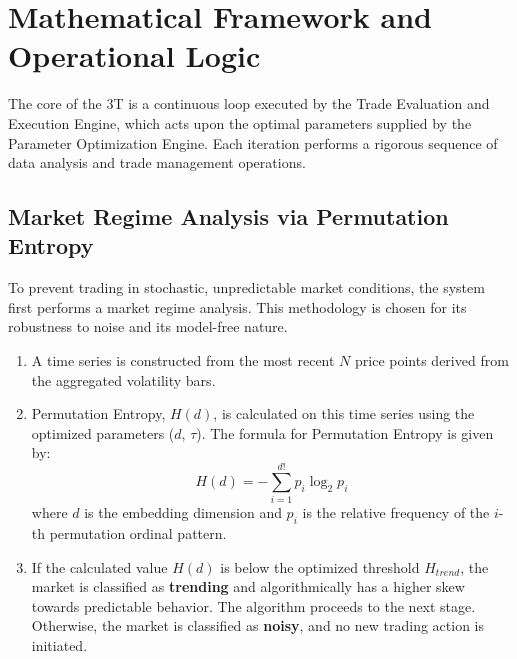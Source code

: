 \documentclass[10pt]{article}
\begin{document}
\section{Mathematical Framework and Operational Logic}
The core of the 3T is a continuous loop executed by the Trade Evaluation and Execution Engine, which acts upon the optimal parameters supplied by the Parameter Optimization Engine. Each iteration performs a rigorous sequence of data analysis and trade management operations.

\subsection{Market Regime Analysis via Permutation Entropy}
To prevent trading in stochastic, unpredictable market conditions, the system first performs a market regime analysis. This methodology is chosen for its robustness to noise and its model-free nature.\cite{PhysRevLett.88.174102}
\begin{enumerate}
    \item A time series is constructed from the most recent $N$ price points derived from the aggregated volatility bars.
    \item Permutation Entropy, $H(d)$, is calculated on this time series using the optimized parameters ($d$, $\tau$). The formula for Permutation Entropy is given by:
    $$ H(d) = -\sum_{i=1}^{d!} p_i \log_2 p_i $$
    where $d$ is the embedding dimension and $p_i$ is the relative frequency of the $i$-th permutation ordinal pattern.
    \item If the calculated value $H(d)$ is below the optimized threshold $H_{trend}$, the market is classified as \textbf{trending} and algorithmically has a higher skew towards predictable behavior. The algorithm proceeds to the next stage. Otherwise, the market is classified as \textbf{noisy}, and no new trading action is initiated.
\end{enumerate}
\end{document}
